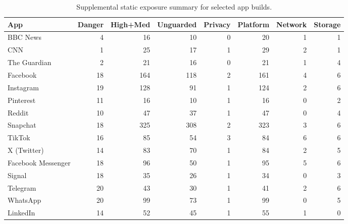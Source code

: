 \begin{table}[!t]
\centering
\caption{Supplemental static exposure summary for selected app builds.}
\label{tab:static-exposure-summary}
\tiny
\begin{tabular}{lrrrrrrr}
\toprule
App & Danger & High+Med & Unguarded & Privacy & Platform & Network & Storage \\
\midrule
BBC News & 4 & 16 & 10 & 0 & 20 & 1 & 1 \\
CNN & 1 & 25 & 17 & 1 & 29 & 2 & 1 \\
The Guardian & 2 & 21 & 16 & 0 & 21 & 1 & 4 \\
Facebook & 18 & 164 & 118 & 2 & 161 & 4 & 6 \\
Instagram & 19 & 128 & 91 & 1 & 124 & 2 & 6 \\
Pinterest & 11 & 16 & 10 & 1 & 16 & 0 & 2 \\
Reddit & 10 & 47 & 37 & 1 & 47 & 0 & 4 \\
Snapchat & 18 & 325 & 308 & 2 & 323 & 3 & 6 \\
TikTok & 16 & 85 & 54 & 3 & 84 & 6 & 6 \\
X (Twitter) & 14 & 83 & 70 & 1 & 84 & 2 & 5 \\
Facebook Messenger & 18 & 96 & 50 & 1 & 95 & 5 & 6 \\
Signal & 18 & 35 & 26 & 1 & 34 & 0 & 3 \\
Telegram & 20 & 43 & 30 & 1 & 41 & 2 & 6 \\
WhatsApp & 20 & 99 & 73 & 1 & 99 & 0 & 5 \\
LinkedIn & 14 & 52 & 45 & 1 & 55 & 1 & 0 \\
\bottomrule
\end{tabular}
\end{table}
